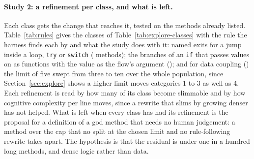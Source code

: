 \documentclass[11pt,a4paper]{article}
\newcommand{\sig}[1]{\texttt{#1}}
\begin{document}
\paragraph{Study 2: a refinement per class, and what is left.} Each class
gets the change that reaches it, tested on the methods already listed.
Table~\ref{tab:rules} gives the classes of Table~\ref{tab:explore-classes}
with the rule the harness finds each by and what the study does with it:
named exits for a jump inside a loop, \sig{try} or \sig{switch}
(\exControlContained{} methods); the branches of an \sig{if} that passes
values on as functions with the value as the flow's argument
(\exIfPasses{}); and for data coupling (\exData{}) the limit of five swept
from three to ten over the whole population, since
Section~\ref{sec:explore} shows a higher limit moves categories 1 to 3 as
well as 4. Each refinement is read by how many of its class become
slimmable and by how cognitive complexity per line moves, since a rewrite
that slims by growing denser has not helped. What is left when every class
has had its refinement is the proposal for a definition of a god method
that needs no human judgement: a method over the cap that no split at the
chosen limit and no rule-following rewrite takes apart. The hypothesis is
that the residual is under one in a hundred long methods, and dense logic
rather than data.
\end{document}
